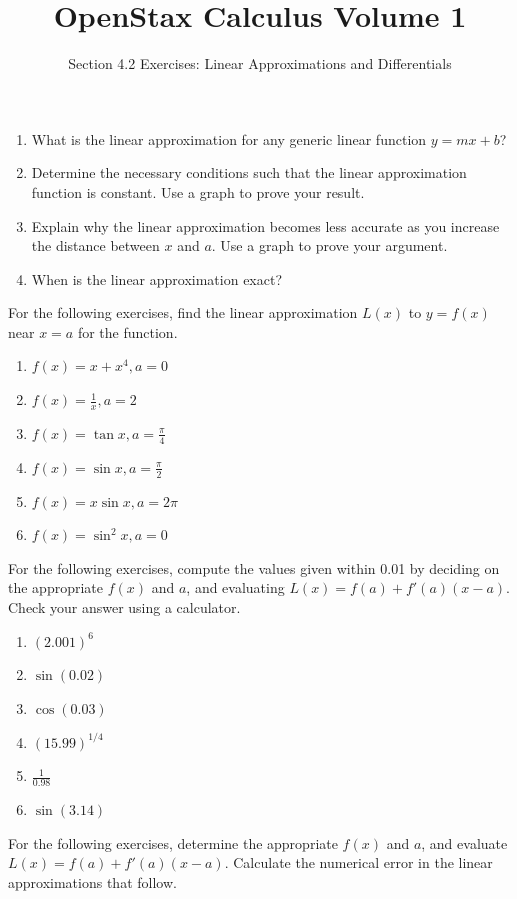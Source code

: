 \documentclass{exercises}
\title{OpenStax Calculus Volume 1}
\subtitle{Section 4.2 Exercises: Linear Approximations and Differentials}
\author{}
\date{}
\begin{document}
\maketitle

\begin{enumerate}[start=1]
\item What is the linear approximation for any generic linear function $y=mx+b$?
\item Determine the necessary conditions such that the linear approximation function is constant. Use a graph to prove your result.
\item Explain why the linear approximation becomes less accurate as you increase the distance between $x$ and $a$. Use a graph to prove your argument.
\item When is the linear approximation exact?
\end{enumerate}

For the following exercises, find the linear approximation $L(x)$ to $y=f(x)$ near $x=a$ for the function.

\begin{enumerate}[resume]
\item $f(x)=x+x^{4},a=0$
\item $f(x)=\frac{1}{x},a=2$
\item $f(x)=\tan x,a=\frac{\pi}{4}$
\item $f(x)=\sin x,a=\frac{\pi}{2}$
\item $f(x)=x\sin x,a=2\pi$
\item $f(x)=\sin^{2}x,a=0$
\end{enumerate}

For the following exercises, compute the values given within 0.01 by deciding on the appropriate $f(x)$ and $a$, and evaluating $L(x)=f(a)+f'(a)(x-a)$. Check your answer using a calculator.

\begin{enumerate}[resume]
\item \techrequired ${(2.001)}^{6}$
\item \techrequired $\sin(0.02)$
\item \techrequired $\cos(0.03)$
\item \techrequired ${(15.99)}^{1/4}$
\item \techrequired $\frac{1}{0.98}$
\item \techrequired $\sin(3.14)$
\end{enumerate}

For the following exercises, determine the appropriate $f(x)$ and $a$, and evaluate $L(x)=f(a)+f'(a)(x-a)$. Calculate the numerical error in the linear approximations that follow.
\end{document}
